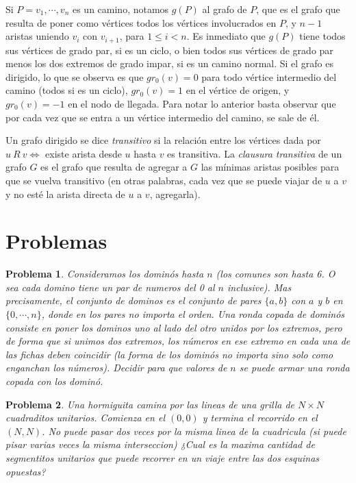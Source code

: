 \documentclass{article}
\newtheorem{problema}{{\sc Problema}}
\begin{document}
Si $P = v_1, \cdots, v_n$ es un camino, notamos $g(P)$ al grafo de $P$, que es el grafo que resulta de poner como vértices todos los vértices involucrados en $P$, y $n-1$ aristas uniendo $v_i$ con $v_{i+1}$, para $1 \leq i < n$. Es inmediato que $g(P)$ tiene todos sus vértices de grado par, si es un ciclo, o bien todos sus vértices de grado par menos los dos extremos de grado impar, si es un camino normal. Si el grafo es dirigido, lo que se observa es que $gr_0(v) = 0$ para todo vértice intermedio del camino (todos si es un ciclo), $gr_0(v) = 1$ en el vértice de origen, y $gr_0(v) = -1$ en el nodo de llegada. Para notar lo anterior basta observar que por cada vez que se entra a un vértice intermedio del camino, se sale de él.

Un grafo dirigido se dice \textit{transitivo} si la relación entre los vértices dada por $u\ R\ v \Leftrightarrow $ existe arista desde $u$ hasta $v$
es transitiva. La \textit{clausura transitiva} de un grafo $G$ es el grafo que resulta de agregar a $G$ las mínimas aristas posibles para que
se vuelva transitivo (en otras palabras, cada vez que se puede viajar de $u$ a $v$ y no esté la arista directa de $u$ a $v$, agregarla).

\pagebreak

\section{Problemas}

\begin{problema} 
Consideramos los dominós hasta $n$ (los comunes son hasta 6. O sea cada domino tiene un par de numeros del 0 al $n$ inclusive).
Mas precisamente, el conjunto de dominos es el conjunto de pares $\{a,b\}$ con $a$ y $b$ en $\{0,\cdots,n\}$, donde en los pares no importa el orden.
Una ronda copada de dominós consiste en poner los dominos uno al lado del otro unidos por los extremos, pero de forma que si unimos dos extremos, los números en ese extremo en cada una de las fichas deben coincidir (la forma de los dominós no importa sino solo como enganchan los números).
Decidir para que valores de $n$ se puede armar una ronda copada con los dominó.
\end{problema}

\begin{problema} 
Una hormiguita camina por las lineas de una grilla de $N \times N$ cuadraditos unitarios. Comienza en el $(0,0)$ y termina el recorrido en el $(N,N)$.
No puede pasar dos veces por la misma linea de la cuadricula (si puede pisar varias veces la misma interseccion) 
¿Cual es la maxima cantidad de segmentitos unitarios que puede recorrer en un viaje entre las dos esquinas opuestas?
\end{problema}
\end{document}
